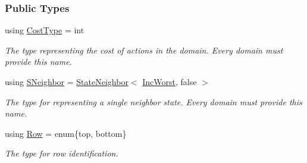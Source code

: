 \subsubsection*{Public Types}
\begin{DoxyCompactItemize}
\item 
using \hyperlink{structslb_1_1ext_1_1domain_1_1incWorst_1_1IncWorst_a3536d51d82cab776b7f95ad90847f46c}{Cost\+Type} = int\hypertarget{structslb_1_1ext_1_1domain_1_1incWorst_1_1IncWorst_a3536d51d82cab776b7f95ad90847f46c}{}\label{structslb_1_1ext_1_1domain_1_1incWorst_1_1IncWorst_a3536d51d82cab776b7f95ad90847f46c}

\begin{DoxyCompactList}\small\item\em The type representing the cost of actions in the domain. Every domain must provide this name. \end{DoxyCompactList}\item 
using \hyperlink{structslb_1_1ext_1_1domain_1_1incWorst_1_1IncWorst_a87bebe080571b8b793d9747bc36df3b3}{S\+Neighbor} = \hyperlink{structslb_1_1core_1_1sb_1_1StateNeighbor}{State\+Neighbor}$<$ \hyperlink{structslb_1_1ext_1_1domain_1_1incWorst_1_1IncWorst}{Inc\+Worst}, false $>$\hypertarget{structslb_1_1ext_1_1domain_1_1incWorst_1_1IncWorst_a87bebe080571b8b793d9747bc36df3b3}{}\label{structslb_1_1ext_1_1domain_1_1incWorst_1_1IncWorst_a87bebe080571b8b793d9747bc36df3b3}

\begin{DoxyCompactList}\small\item\em The type for representing a single neighbor state. Every domain must provide this name. \end{DoxyCompactList}\item 
using \hyperlink{structslb_1_1ext_1_1domain_1_1incWorst_1_1IncWorst_a1285933acd81f565206f99debac7f211}{Row} = enum\{top, bottom\}\hypertarget{structslb_1_1ext_1_1domain_1_1incWorst_1_1IncWorst_a1285933acd81f565206f99debac7f211}{}\label{structslb_1_1ext_1_1domain_1_1incWorst_1_1IncWorst_a1285933acd81f565206f99debac7f211}

\begin{DoxyCompactList}\small\item\em The type for row identification. \end{DoxyCompactList}\end{DoxyCompactItemize}

